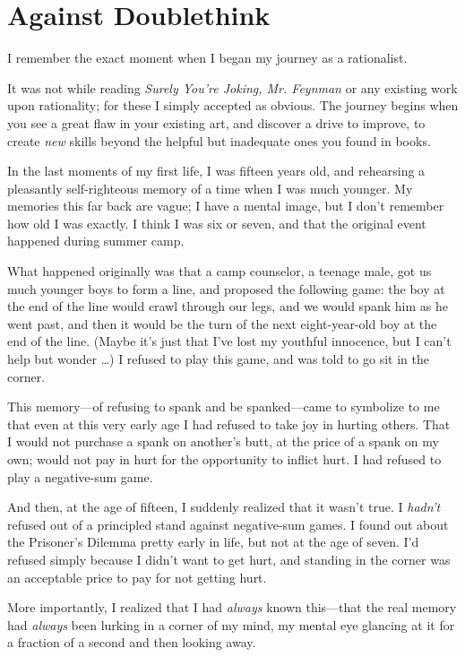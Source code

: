 \chapter{Against Doublethink}


{
 I remember the exact moment when I began my journey as a
rationalist. }

{
 It was not while reading \textit{Surely You're
Joking, Mr. Feynman} or any existing work upon rationality; for these I
simply accepted as obvious. The journey begins when you see a great
flaw in your existing art, and discover a drive to improve, to create
\textit{new} skills beyond the helpful but inadequate ones you found in
books.}

{
 In the last moments of my first life, I was fifteen years old, and
rehearsing a pleasantly self-righteous memory of a time when I was much
younger. My memories this far back are vague; I have a mental image,
but I don't remember how old I was exactly. I think I
was six or seven, and that the original event happened during summer
camp.}

{
 What happened originally was that a camp counselor, a teenage
male, got us much younger boys to form a line, and proposed the
following game: the boy at the end of the line would crawl through our
legs, and we would spank him as he went past, and then it would be the
turn of the next eight-year-old boy at the end of the line. (Maybe
it's just that I've lost my youthful
innocence, but I can't help but wonder \ldots) I refused
to play this game, and was told to go sit in the corner.}

{
 This memory---of refusing to spank and be spanked---came to
symbolize to me that even at this very early age I had refused to take
joy in hurting others. That I would not purchase a spank on
another's butt, at the price of a spank on my own;
would not pay in hurt for the opportunity to inflict hurt. I had
refused to play a negative-sum game.}

{
 And then, at the age of fifteen, I suddenly realized that it
wasn't true. I \textit{hadn't} refused
out of a principled stand against negative-sum games. I found out about
the Prisoner's Dilemma pretty early in life, but not at
the age of seven. I'd refused simply because I
didn't want to get hurt, and standing in the corner was
an acceptable price to pay for not getting hurt.}

{
 More importantly, I realized that I had \textit{always} known
this---that the real memory had \textit{always} been lurking in a
corner of my mind, my mental eye glancing at it for a fraction of a
second and then looking away.}

